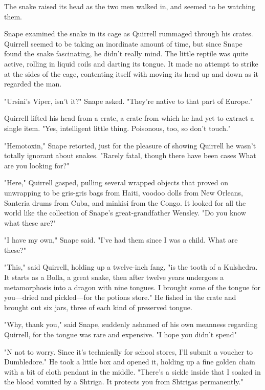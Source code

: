 The snake raised its head as the two men walked in, and seemed to be watching them.

Snape examined the snake in its cage as Quirrell rummaged through his crates. Quirrell seemed to be taking an inordinate amount of time, but since Snape found the snake fascinating, he didn't really mind. The little reptile was quite active, rolling in liquid coils and darting its tongue. It made no attempt to strike at the sides of the cage, contenting itself with moving its head up and down as it regarded the man.

"Ursini's Viper, isn't it?" Snape asked. "They're native to that part of Europe."

Quirrell lifted his head from a crate, a crate from which he had yet to extract a single item. "Yes, intelligent little thing. Poisonous, too, so don't touch."

"Hemotoxin," Snape retorted, just for the pleasure of showing Quirrell he wasn't totally ignorant about snakes. "Rarely fatal, though there have been cases{\el} What are you looking for?"

"Here," Quirrell gasped, pulling several wrapped objects that proved on unwrapping to be gris-gris bags from Haiti, voodoo dolls from New Orleans, Santeria drums from Cuba, and minkisi from the Congo. It looked for all the world like the collection of Snape's great-grandfather Wensley. "Do you know what these are?"

"I have my own," Snape said. "I've had them since I was a child. What are these?"

"This," said Quirrell, holding up a twelve-inch fang, "is the tooth of a Kulshedra. It starts as a Bolla, a great snake, then after twelve years undergoes a metamorphosis into a dragon with nine tongues. I brought some of the tongue for you—dried and pickled—for the potions store." He fished in the crate and brought out six jars, three of each kind of preserved tongue.

"Why, thank you," said Snape, suddenly ashamed of his own meanness regarding Quirrell, for the tongue was rare and expensive. "I hope you didn't spend{\el}"

"N{\el} not to worry. Since it's technically for school stores, I'll submit a voucher to Dumbledore." He took a little box and opened it, holding up a fine golden chain with a bit of cloth pendant in the middle. "There's a sickle inside that I soaked in the blood vomited by a Shtriga. It protects you from Shtrigas permanently."


